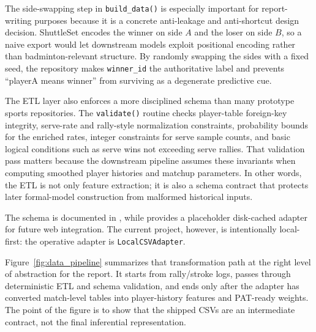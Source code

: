 \documentclass{article}
\begin{document}
The side-swapping step in \texttt{build\_data()} is especially important for report-writing purposes because it is a concrete anti-leakage and anti-shortcut design decision. ShuttleSet encodes the winner on side \(A\) and the loser on side \(B\), so a naive export would let downstream models exploit positional encoding rather than badminton-relevant structure. By randomly swapping the sides with a fixed seed, the repository makes \texttt{winner\_id} the authoritative label and prevents ``playerA means winner'' from surviving as a degenerate predictive cue.

The ETL layer also enforces a more disciplined schema than many prototype sports repositories. The \texttt{validate()} routine checks player-table foreign-key integrity, serve-rate and rally-style normalization constraints, probability bounds for the enriched rates, integer constraints for serve sample counts, and basic logical conditions such as serve wins not exceeding serve rallies. That validation pass matters because the downstream pipeline assumes these invariants when computing smoothed player histories and matchup parameters. In other words, the ETL is not only feature extraction; it is also a schema contract that protects later formal-model construction from malformed historical inputs.

The schema is documented in , while  provides a placeholder disk-cached adapter for future web integration. The current project, however, is intentionally local-first: the operative adapter is \texttt{LocalCSVAdapter}.

Figure~\ref{fig:data_pipeline} summarizes that transformation path at the right level of abstraction for the report. It starts from rally/stroke logs, passes through deterministic ETL and schema validation, and ends only after the adapter has converted match-level tables into player-history features and PAT-ready weights. The point of the figure is to show that the shipped CSVs are an intermediate contract, not the final inferential representation.
\end{document}
